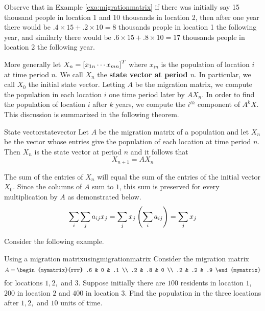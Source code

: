 Observe that in Example \ref{exa:migrationmatrix} if there was initially say 15
thousand people in location 1 and 10 thousands in location 2, then
after one year there would be $.4 \times 15 + .2 \times 10 = 8$
thousands people in location 1 the following year, and similarly 
there would be $.6 \times 15 + .8 \times 10 = 17$
thousands people in location 2 the following year.

More generally let $X_n=\left[x_{1n} \cdots x_{mn}\right] ^{T}$ where $x_{in}$ is the
population of location $i$ at time period $n$. We call $X_n$ the \textbf{state vector at period $n$}. In particular, we call $X_0$ the initial state vector. Letting $A$ be the migration matrix, we compute the population in each location $i$ one time period later by $AX_n$. In order to find the population of location $i$ after $k$
years, we compute the $i^{th}$ component of $A^{k}X.$ This discussion is summarized in the following theorem. 

\begin{theorem}{State vector}{statevector}
Let $A$ be the migration matrix of a population and let $X_n$ be the vector whose entries give the population of each location at time period $n$. Then $X_n$ is the state vector at period $n$ and it follows that 
\[
X_{n+1} = A X_n
\]
\end{theorem}

The sum of the entries of $X_n$ will equal the sum of the entries of the initial
vector $X_{0}$. Since the columns of $A$ sum to $1$, this sum is preserved for every
multiplication by $A$ as demonstrated below. 
\begin{equation*}
\sum_{i}\sum_{j}a_{ij}x_{j}=\sum_{j}x_{j}\left(\sum_{i}a_{ij}\right)
=\sum_{j}x_{j}
\end{equation*}

Consider the following example.

\begin{example}{Using a migration matrix}{usingmigrationmatrix}
Consider the migration matrix 
\begin{equation*}
A = 
\begin{mymatrix}{rrr}
.6 & 0 & .1 \\
.2 & .8 & 0 \\
.2 & .2 & .9
\end{mymatrix} 
\end{equation*}
 for locations $1,2,$ and $3.$ Suppose initially there are $100$
residents in location $1$, $200$ in location $2$ and $400$ in location $3$. Find the
population in the three locations after $1,2,$ and $10$ units of time.
\end{example}


